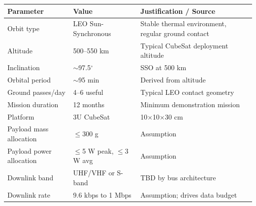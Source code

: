 \begin{longtable}{L{4cm} L{3cm} L{7cm}}
\toprule
\textbf{Parameter} & \textbf{Value} & \textbf{Justification / Source} \\
\midrule
Orbit type & LEO Sun-Synchronous & Stable thermal environment, regular ground contact \\
Altitude & 500--550 km & Typical CubeSat deployment altitude \\
Inclination & $\sim$97.5$^\circ$ & SSO at 500 km \\
Orbital period & $\sim$95 min & Derived from altitude \\
Ground passes/day & 4--6 useful & Typical LEO contact geometry \\
Mission duration & 12 months & Minimum demonstration mission \\
Platform & 3U CubeSat & 10$\times$10$\times$30 cm \\
Payload mass allocation & $\leq$300 g & Assumption \\
Payload power allocation & $\leq$5 W peak, $\leq$3 W avg & Assumption \\
Downlink band & UHF/VHF or S-band & TBD by bus architecture \\
Downlink rate & 9.6 kbps to 1 Mbps & Assumption; drives data budget \\
\bottomrule
\end{longtable}

